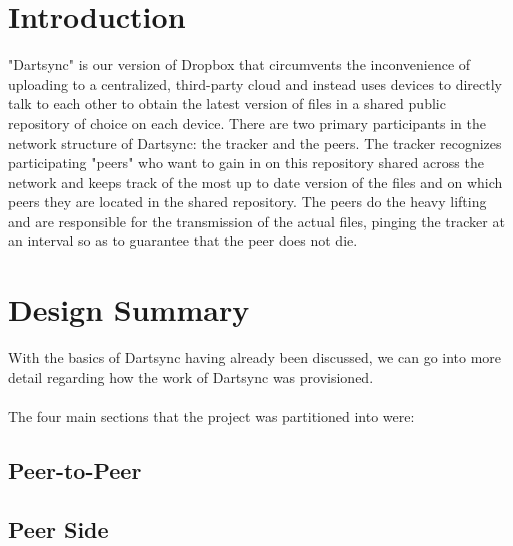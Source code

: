 \documentclass[12pt]{article}
\begin{document}
\maketitle

\section{Introduction}
	"Dartsync" is our version of Dropbox that circumvents the inconvenience of uploading to a centralized, third-party cloud and instead uses devices to directly talk to each other to obtain the latest version of files in a shared public repository of choice on each device. There are two primary participants in the network structure of Dartsync: the tracker and the peers. The tracker recognizes participating "peers" who want to gain in on this repository shared across the network and keeps track of the most up to date version of the files and on which peers they are located in the shared repository. The peers do the heavy lifting and are responsible for the transmission of the actual files, pinging the tracker at an interval so as to guarantee that the peer does not die. 

\section{Design Summary}\label{previous work}
	With the basics of Dartsync having already been discussed, we can go into more detail regarding how the work of Dartsync was provisioned. \\\\The four main sections that the project was partitioned into were:
	
\subsection {Peer-to-Peer}
\subsection {Peer Side}
\end{document}
